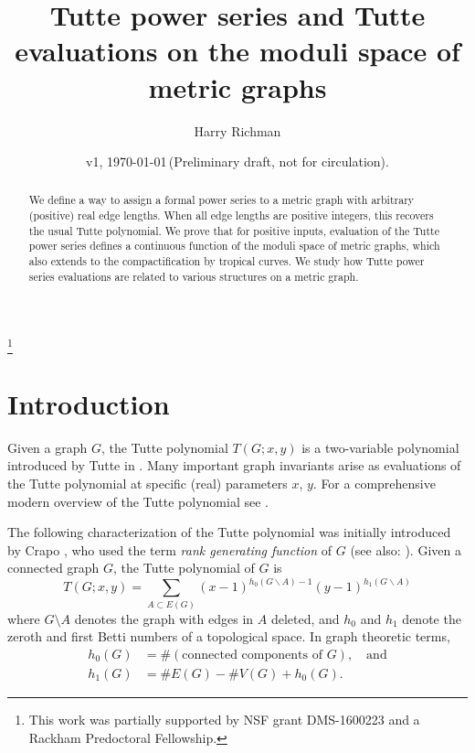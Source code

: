 \documentclass{amsart}
\theoremstyle{definition}
\begin{document}
\title[Tutte power series on metric graphs]{Tutte power series and Tutte evaluations on the moduli space of metric graphs}
\author{Harry Richman}
\date{v1, \today  \,(Preliminary draft, not for circulation).}
\thanks{This work was partially supported by NSF grant DMS-1600223
and a Rackham Predoctoral Fellowship.}


\begin{abstract}
We define a way to assign a formal power series to a metric graph with arbitrary
(positive) real edge lengths.
When all edge lengths are positive integers,
this recovers the usual Tutte polynomial.
We prove that for positive inputs, evaluation of the Tutte power series
defines a continuous function of the moduli space of metric graphs,
which also extends to the compactification by tropical curves.
We study how Tutte power series evaluations are
related to various structures on a metric graph.
\end{abstract}
\maketitle


\section{Introduction}
Given a graph $G$,
the Tutte polynomial $T(G;x,y)$ 
is 
 a two-variable polynomial %
introduced by Tutte in \cite{Tut}.
Many important graph invariants arise as evaluations of 
the Tutte polynomial %
at specific (real) parameters $x$, $y$.
For a comprehensive modern overview of the Tutte polynomial see \cite{BO} \cite{EMM}.

The following characterization of the Tutte polynomial was initially introduced by Crapo \cite{Cra}, who used the term {\em rank generating function} of $G$
(see also: \cite[Definition 3]{EMM}).
Given a connected graph $G $, 
the Tutte polynomial of $G$ is 
\begin{equation}
\label{eq:tutte-graph}
T(G; x,y) = \sum_{A \subset E(G)} (x-1)^{h_0(G\backslash A) - 1}(y-1)^{h_1(G\backslash A)}
\end{equation}
where $G\setminus A$ denotes the graph with edges in $A$ deleted,
and $h_0$ and $h_1$ denote the zeroth and first Betti numbers of 
a topological space.
In graph theoretic terms,
\begin{align*}
h_0(G) &= \#(\text{connected components of }G), \quad\text{and}\\
h_1(G) &= \# E(G) - \# V(G) + h_0(G) .
\end{align*}
\end{document}
